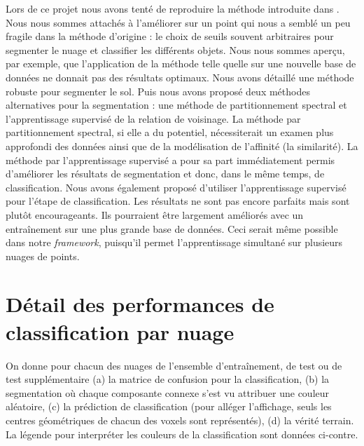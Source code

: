 \documentclass[a4paper, onecolumn, 11pt]{article}
\begin{document}
Lors de ce projet nous avons tenté de reproduire la méthode introduite dans \cite{aka_article}. Nous nous sommes attachés à l'améliorer sur un point qui nous a semblé un peu fragile dans la méthode d'origine : le choix de seuils souvent arbitraires pour segmenter le nuage et classifier les différents objets. Nous nous sommes aperçu, par exemple, que l'application de la méthode telle quelle sur une nouvelle base de données ne donnait pas des résultats optimaux. Nous avons détaillé une méthode robuste pour segmenter le sol. Puis nous avons proposé deux méthodes alternatives pour la segmentation : une méthode de partitionnement spectral et l'apprentissage supervisé de la relation de voisinage. La méthode par partitionnement spectral, si elle a du potentiel, nécessiterait un examen plus approfondi des données ainsi que de la modélisation de l'affinité (la similarité). La méthode par l'apprentissage supervisé a pour sa part immédiatement permis d'améliorer les résultats de segmentation et donc, dans le même temps, de classification. Nous avons également proposé d'utiliser l'apprentissage supervisé pour l'étape de classification. Les résultats ne sont pas encore parfaits mais sont plutôt encourageants. Ils pourraient être largement améliorés avec un entraînement sur une plus grande base de données. Ceci serait même possible dans notre \emph{framework}, puisqu'il permet l'apprentissage simultané sur plusieurs nuages de points.

\clearpage
\newpage

\nocite{*}



\newpage
\appendix
\section{Détail des performances de classification par nuage}
\label{annexe-resultats}

\begin{figure}
\centering
{}
\end{figure}

On donne pour chacun des nuages de l'ensemble d'entraînement, de test ou de test supplémentaire (a) la matrice de confusion pour la classification, (b) la segmentation où chaque composante connexe s'est vu attribuer une couleur aléatoire, (c) la prédiction de classification (pour alléger l'affichage, seuls les centres géométriques de chacun des voxels sont représentés), (d) la vérité terrain. La légende pour interpréter les couleurs de la classification sont données ci-contre.
\end{document}

